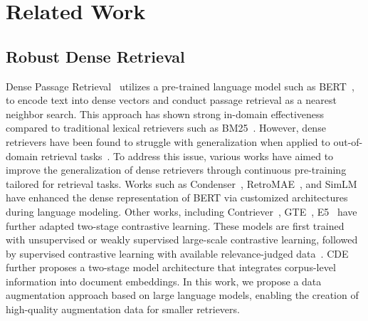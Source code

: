 \section{Related Work}
\subsection{Robust Dense Retrieval}
Dense Passage Retrieval~\citep{karpukhin-etal-2020-dense} utilizes a pre-trained language model such as BERT~\citep{devlin-etal-2019-bert}, to encode text into dense vectors and conduct passage retrieval as a nearest neighbor search.
This approach has shown strong in-domain effectiveness compared to traditional lexical retrievers such as BM25~\citep{robertson2009bm25}.
However, dense retrievers have been found to struggle with generalization when applied to out-of-domain retrieval tasks~\citep{thakur2021beir}.
To address this issue, various works have aimed to improve the generalization of dense retrievers through continuous pre-training tailored for retrieval tasks.
Works such as Condenser~\citep{gao-callan-2021-condenser}, RetroMAE~\citep{xiao-etal-2022-retromae}, and SimLM~\citep{wang-etal-2023-simlm} have enhanced the dense representation of BERT via customized architectures during language modeling.
Other works, including Contriever~\citep{izacard2022unsup}, GTE~\citep{li2023generaltextembeddingsmultistage}, E5~\citep{wang2024text} have further adapted two-stage contrastive learning.
These models are first trained with unsupervised or weakly supervised large-scale contrastive learning, followed by supervised contrastive learning with available relevance-judged data~\citep{nussbaum2024nomic, yu2024arcticembed}.
CDE~\citep{morris2024cde} further proposes a two-stage model architecture that integrates corpus-level information into document embeddings.
In this work, we propose a data augmentation approach based on large language models, enabling the creation of high-quality augmentation data for smaller retrievers.

